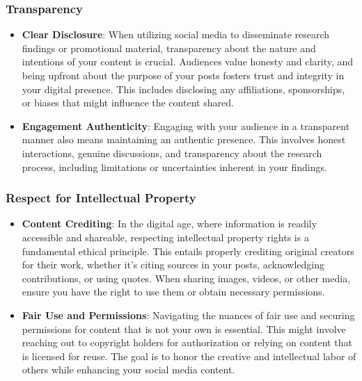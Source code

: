 \documentclass[
]{book}
\begin{document}
\hypertarget{transparency}{%
\subsubsection*{Transparency}\label{transparency}}

\begin{itemize}
\item
  \textbf{Clear Disclosure}: When utilizing social media to disseminate research findings or promotional material, transparency about the nature and intentions of your content is crucial. Audiences value honesty and clarity, and being upfront about the purpose of your posts fosters trust and integrity in your digital presence. This includes disclosing any affiliations, sponsorships, or biases that might influence the content shared.
\item
  \textbf{Engagement Authenticity}: Engaging with your audience in a transparent manner also means maintaining an authentic presence. This involves honest interactions, genuine discussions, and transparency about the research process, including limitations or uncertainties inherent in your findings.
\end{itemize}

\hypertarget{respect-for-intellectual-property}{%
\subsubsection*{Respect for Intellectual Property}\label{respect-for-intellectual-property}}

\begin{itemize}
\item
  \textbf{Content Crediting}: In the digital age, where information is readily accessible and shareable, respecting intellectual property rights is a fundamental ethical principle. This entails properly crediting original creators for their work, whether it's citing sources in your posts, acknowledging contributions, or using quotes. When sharing images, videos, or other media, ensure you have the right to use them or obtain necessary permissions.
\item
  \textbf{Fair Use and Permissions}: Navigating the nuances of fair use and securing permissions for content that is not your own is essential. This might involve reaching out to copyright holders for authorization or relying on content that is licensed for reuse. The goal is to honor the creative and intellectual labor of others while enhancing your social media content.
\end{itemize}
\end{document}
